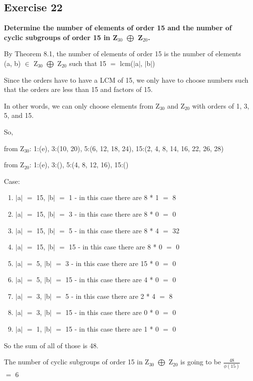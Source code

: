 \documentclass{article}
\newcommand{\mt}[1]{\ensuremath{#1}}
\newcommand\ssc[2][\DefaultOpt]{%
  \def\DefaultOpt{#2}%
  \subsection[#1]{#2}%
}
\newcommand{\elist}{\end{enumerate}}
\newcommand{\bilist}{\begin{enumerate}[label=\roman*)]}
\newcommand{\mem}{\mt{\in} }
\newcommand{\av}[1]{\mt{|}#1\mt{|}}  %
\newcommand{\eql}{\mt{=} }
\newcommand{\uw}[2]{#1\mt{_{#2}}}
\newcommand{\frc}[2]{\mt{\frac{#1}{#2}}}
\newcommand{\edp}{\mt{\bigoplus} }
\begin{document}
{{}
\ssc{Exercise 22}{
\textbf{Determine the number of elements of order 15 and the number of cyclic subgroups of order 15 in \uw{Z}{30} \edp \uw{Z}{20}.}

By Theorem 8.1, the number of elements of order 15 is the number of elements (a, b) \mem \uw{Z}{30} \edp \uw{Z}{20} such that 15 \eql lcm(\av{a}, \av{b})

Since the orders have to have a LCM of 15, we only have to choose numbers such that the orders are less than 15 and factors of 15.

In other words, we can only choose elements from \uw{Z}{30} and \uw{Z}{20} with orders of 1, 3, 5, and 15.

So,

from \uw{Z}{30}: 1:(e), 3:(10, 20), 5:(6, 12, 18, 24), 15:(2, 4, 8, 14, 16, 22, 26, 28)

from \uw{Z}{20}: 1:(e), 3:(), 5:(4, 8, 12, 16), 15:()

Case:
\bilist
\item \av{a} \eql 15, \av{b} \eql 1 - in this case there are 8 * 1 \eql 8
\item \av{a} \eql 15, \av{b} \eql 3 - in this case there are 8 * 0 \eql 0
\item \av{a} \eql 15, \av{b} \eql 5 - in this case there are 8 * 4 \eql 32
\item \av{a} \eql 15, \av{b} \eql 15 - in this case there are 8 * 0 \eql 0
\item \av{a} \eql 5, \av{b} \eql 3 - in this case there are 15 * 0 \eql 0
\item \av{a} \eql 5, \av{b} \eql 15 - in this case there are 4 * 0 \eql 0
\item \av{a} \eql 3, \av{b} \eql 5 - in this case there are 2 * 4 \eql 8
\item \av{a} \eql 3, \av{b} \eql 15 - in this case there are 0 * 0 \eql 0
\item \av{a} \eql 1, \av{b} \eql 15 - in this case there are 1 * 0 \eql 0
\elist

So the sum of all of those is 48.

The number of cyclic subgroups of order 15 in \uw{Z}{30} \edp \uw{Z}{20} is going to be \frc{48}{\phi(15)} \eql 6
}
}
\end{document}
